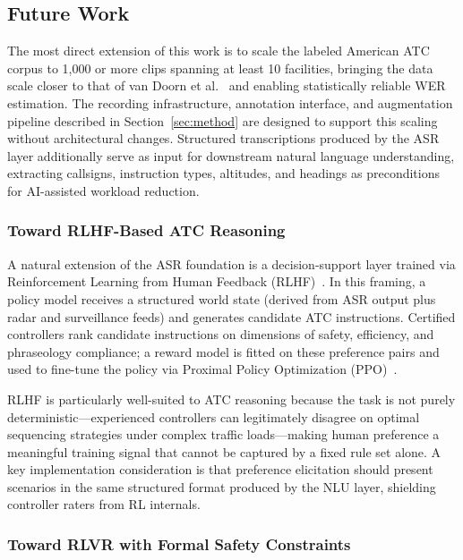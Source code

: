 \documentclass[11pt,a4paper]{article}
\begin{document}
\subsection{Future Work}

The most direct extension of this work is to scale the labeled American ATC
corpus to 1,000 or more clips spanning at least 10 facilities, bringing the
data scale closer to that of van Doorn et al.~\cite{vandoorn2024whisperatc}
and enabling statistically reliable WER estimation. The recording
infrastructure, annotation interface, and augmentation pipeline described in
Section~\ref{sec:method} are designed to support this scaling without
architectural changes. Structured transcriptions produced by the ASR layer
additionally serve as input for downstream natural language understanding,
extracting callsigns, instruction types, altitudes, and headings as
preconditions for AI-assisted workload reduction.

\subsubsection{Toward RLHF-Based ATC Reasoning}

A natural extension of the ASR foundation is a decision-support layer trained
via Reinforcement Learning from Human Feedback
(RLHF)~\cite{ouyang2022rlhf,christiano2017rlhf}. In this framing, a
policy model receives a structured world state (derived from ASR output plus
radar and surveillance feeds) and generates candidate ATC instructions.
Certified controllers rank candidate instructions on dimensions of safety,
efficiency, and phraseology compliance; a reward model is fitted on these
preference pairs and used to fine-tune the policy via Proximal Policy
Optimization (PPO)~\cite{schulman2017ppo}.

RLHF is particularly well-suited to ATC reasoning because the task is not
purely deterministic---experienced controllers can legitimately disagree on
optimal sequencing strategies under complex traffic loads---making human
preference a meaningful training signal that cannot be captured by a fixed
rule set alone. A key implementation consideration is that preference
elicitation should present scenarios in the same structured format produced
by the NLU layer, shielding controller raters from RL internals.

\subsubsection{Toward RLVR with Formal Safety Constraints}
\end{document}
